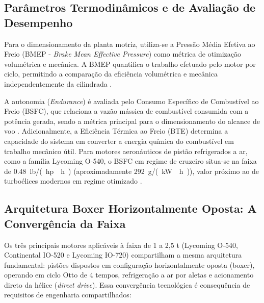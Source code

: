 \documentclass[a4paper,12pt]{article}
\begin{document}
\subsection{Parâmetros Termodinâmicos e de Avaliação de Desempenho}
Para o dimensionamento da planta motriz, utiliza-se a Pressão Média Efetiva ao Freio (BMEP - \textit{Brake Mean Effective Pressure}) como métrica de otimização volumétrica e mecânica. A BMEP quantifica o trabalho efetuado pelo motor por ciclo, permitindo a comparação da eficiência volumétrica e mecânica independentemente da cilindrada \cite{heywood1988}. 

A autonomia (\textit{Endurance}) é avaliada pelo Consumo Específico de Combustível ao Freio (BSFC), que relaciona a vazão mássica de combustível consumida com a potência gerada, sendo a métrica principal para o dimensionamento do alcance de voo \cite{elsayed2016}. Adicionalmente, a Eficiência Térmica ao Freio (BTE) determina a capacidade do sistema em converter a energia química do combustível em trabalho mecânico útil. Para motores aeronáuticos de pistão refrigerados a ar, como a família Lycoming O-540, o BSFC em regime de cruzeiro situa-se na faixa de \SI{0.48}{lb/(hp \cdot h)} (aproximadamente \SI{292}{g/(kW \cdot h)}), valor próximo ao de turboélices modernos em regime otimizado \cite{lycomingmanual}.

\subsection{Arquitetura Boxer Horizontalmente Oposta: A Convergência da Faixa}

Os três principais motores aplicáveis à faixa de 1 a 2{,}5 t (Lycoming O-540, Continental IO-520 e Lycoming IO-720) compartilham a mesma arquitetura fundamental: pistões dispostos em configuração horizontalmente oposta (boxer), operando em ciclo Otto de 4 tempos, refrigeração a ar por aletas e acionamento direto da hélice (\textit{direct drive}). Essa convergência tecnológica é consequência de requisitos de engenharia compartilhados:
\end{document}
